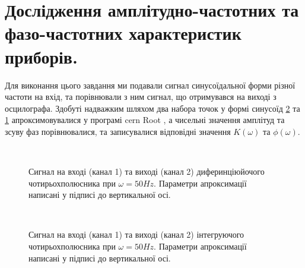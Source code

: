 \section{Дослідження амплітудно-частотних та фазо-частотних характеристик приборів.}

Для виконання цього завдання ми подавали сигнал синусоїдальної форми різної частоти на вхід, та порівнювали з ним сигнал, що отримувався на виході з осцилографа. Здобуті надважким шляхом два набора точок у формі синусоїд \ref{fig:expsinI} та \ref{fig:expsinD} апроксимовувалися у програмі cern Root \cite{root}, а чисельні значення амплітуд та зсуву фаз порівнювалися, та записувалися відповідні значення $K(\omega)$ та $\phi(\omega)$. 

\begin{figure}[h]
	 \\
	\caption{Сигнал на вході (канал 1) та виході (канал 2) диферинціюйочого чотирьохполюсника при $\omega = 50Hz$. Параметри апроксимації написані у підписі до вертикальної осі.}
	\label{fig:expsinD}
\end{figure}

\begin{figure}[h]
	 \\
	\caption{Сигнал на вході (канал 1) та виході (канал 2) інтегруючого чотирьохполюсника при $\omega = 50Hz$. Параметри апроксимації написані у підписі до вертикальної осі.}
	\label{fig:expsinI}
\end{figure}

